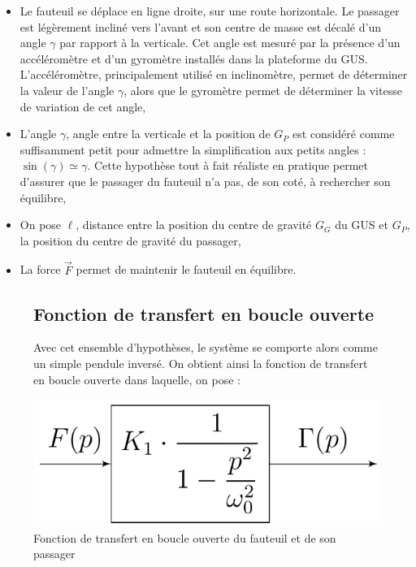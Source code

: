 \begin{itemize}
\item Le fauteuil se déplace en ligne droite, sur une route horizontale. Le passager est légèrement incliné vers l'avant et son centre de masse est décalé d'un angle $\gamma$ par rapport à la verticale. Cet angle est mesuré par la présence d'un accéléromètre et d'un gyromètre installés dans la plateforme du GUS. L'accéléromètre, principalement utilisé en
inclinomètre, permet de déterminer la valeur de l'angle $\gamma$, alors que le gyromètre permet de déterminer la vitesse de variation de cet angle,
\item L'angle $\gamma$, angle entre la verticale et la position de $G_P$ est considéré comme suffisamment petit pour admettre la simplification aux petits angles : $\sin(\gamma) \simeq \gamma$. Cette hypothèse tout à
fait réaliste en pratique permet d'assurer que le passager du fauteuil n'a pas, de son coté, à rechercher son équilibre,
\item On pose $\ell$, distance entre la position du centre de gravité $G_G$ du GUS et $G_P$, la position du centre de gravité du passager,
\item La force $\vec{F}$ permet de maintenir le fauteuil en équilibre.
\end{itemize}

\begin{figure}[ht!]
\begin{minipage}{0.5\linewidth}
\subsection{Fonction de transfert en boucle ouverte}

Avec cet ensemble d'hypothèses, le système se comporte alors comme un simple pendule inversé. On obtient ainsi la fonction de transfert en boucle ouverte dans laquelle, on pose :

\end{minipage}\hfill
\begin{minipage}{0.45\linewidth}
\centering\includegraphics[width=\linewidth]{img/fig17}
\caption{\label{fig17}Fonction de transfert en boucle ouverte du fauteuil et de son passager}
\end{minipage}
\end{figure}

